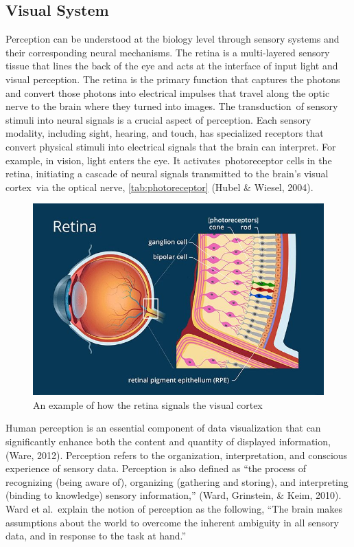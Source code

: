 \documentclass[print]{nuthesis}
\begin{document}
\hypertarget{visual-system}{%
\subsection{Visual System}\label{visual-system}}

Perception can be understood at the biology level through sensory systems and their corresponding neural mechanisms.
The retina is a multi-layered sensory tissue that lines the back of the eye and acts at the interface of input light and visual perception.
The retina is the primary function that captures the photons and convert those photons into electrical impulses that travel along the optic nerve to the brain where they turned into images.
The transduction~of sensory stimuli into neural signals is a crucial aspect of perception.
Each sensory modality, including sight, hearing, and touch, has specialized receptors that convert physical stimuli into electrical signals that the brain can interpret.
For example, in vision, light enters the eye.
It activates~photoreceptor cells in the retina, initiating a cascade of neural signals transmitted to the brain's visual cortex~via the optical nerve, \ref{tab:photoreceptor} (Hubel \& Wiesel, 2004).

\begin{figure}

{\centering \includegraphics[width=0.55\linewidth]{figure/photoreceptors_image} 

}

\caption{An example of how the retina signals the visual cortex}\label{fig:photoreceptor}
\end{figure}

Human perception is an essential component of data visualization that can significantly enhance both the content and quantity of displayed information, (Ware, 2012).
Perception refers to the organization, interpretation, and conscious experience of sensory data.
Perception is also defined as ``the process of recognizing (being aware of), organizing (gathering and storing), and interpreting (binding to knowledge) sensory information,'' (Ward, Grinstein, \& Keim, 2010).
Ward et al.~explain the notion of perception as the following, ``The brain makes assumptions about the world to overcome the inherent ambiguity in all sensory data, and in response to the task at hand.''
\end{document}
